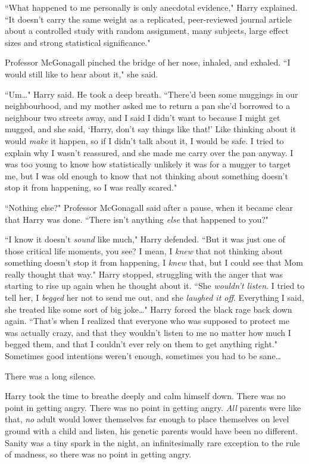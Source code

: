 ``What happened to me personally is only anecdotal evidence," Harry explained. ``It doesn't carry the same weight as a replicated, peer-reviewed journal article about a controlled study with random assignment, many subjects, large effect sizes and strong statistical significance."

Professor McGonagall pinched the bridge of her nose, inhaled, and exhaled. ``I would still like to hear about it," she said.

``Um{\ldots}" Harry said. He took a deep breath. ``There'd been some muggings in our neighbourhood, and my mother asked me to return a pan she'd borrowed to a neighbour two streets away, and I said I didn't want to because I might get mugged, and she said, `Harry, don't say things like that!' Like thinking about it would \emph{make} it happen, so if I didn't talk about it, I would be safe. I tried to explain why I wasn't reassured, and she made me carry over the pan anyway. I was too young to know how statistically unlikely it was for a mugger to target me, but I was old enough to know that not thinking about something doesn't stop it from happening, so I was really scared."

``Nothing else?" Professor McGonagall said after a pause, when it became clear that Harry was done. ``There isn't anything \emph{else} that happened to you?"

``I know it doesn't \emph{sound} like much," Harry defended. ``But it was just one of those critical life moments, you see? I mean, I \emph{knew} that not thinking about something doesn't stop it from happening, I \emph{knew} that, but I could see that Mom really thought that way." Harry stopped, struggling with the anger that was starting to rise up again when he thought about it. ``She \emph{wouldn't listen}. I tried to tell her, I \emph{begged} her not to send me out, and she \emph{laughed it off}. Everything I said, she treated like some sort of big joke{\ldots}" Harry forced the black rage back down again. ``That's when I realized that everyone who was supposed to protect me was actually crazy, and that they wouldn't listen to me no matter how much I begged them, and that I couldn't ever rely on them to get anything right." Sometimes good intentions weren't enough, sometimes you had to be sane{\ldots}

There was a long silence.

Harry took the time to breathe deeply and calm himself down. There was no point in getting angry. There was no point in getting angry. \emph{All} parents were like that, \emph{no} adult would lower themselves far enough to place themselves on level ground with a child and listen, his genetic parents would have been no different. Sanity was a tiny spark in the night, an infinitesimally rare exception to the rule of madness, so there was no point in getting angry.

